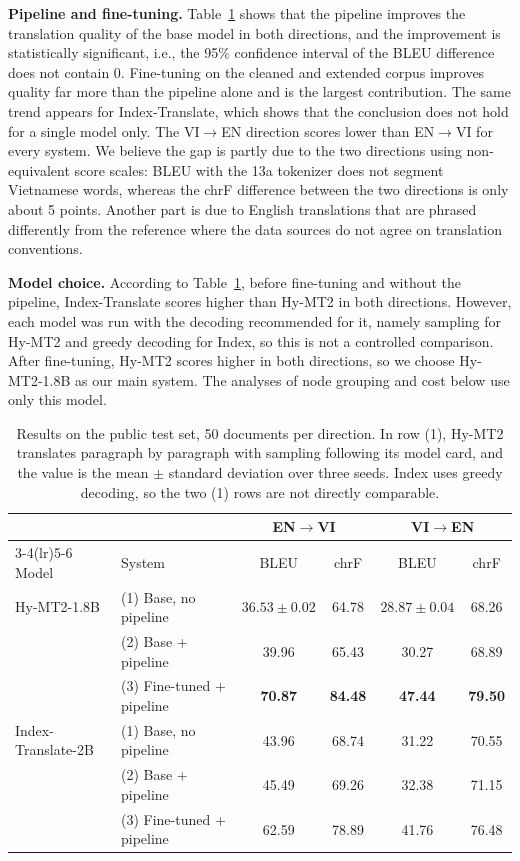 \documentclass[conference]{IEEEtran}
\newcommand{\envi}{EN$\rightarrow$VI}
\newcommand{\vien}{VI$\rightarrow$EN}
\begin{document}
\textbf{Pipeline and fine-tuning.} Table~\ref{tab:main} shows that the pipeline improves the translation quality of the base model in both directions, and the improvement is statistically significant, i.e., the 95\% confidence interval of the BLEU difference does not contain 0. Fine-tuning on the cleaned and extended corpus improves quality far more than the pipeline alone and is the largest contribution. The same trend appears for Index-Translate, which shows that the conclusion does not hold for a single model only. The \vien{} direction scores lower than \envi{} for every system. We believe the gap is partly due to the two directions using non-equivalent score scales: BLEU with the 13a tokenizer does not segment Vietnamese words, whereas the chrF difference between the two directions is only about 5 points. Another part is due to English translations that are phrased differently from the reference where the data sources do not agree on translation conventions.

\textbf{Model choice.} According to Table~\ref{tab:main}, before fine-tuning and without the pipeline, Index-Translate scores higher than Hy-MT2 in both directions. However, each model was run with the decoding recommended for it, namely sampling for Hy-MT2 and greedy decoding for Index, so this is not a controlled comparison. After fine-tuning, Hy-MT2 scores higher in both directions, so we choose Hy-MT2-1.8B as our main system. The analyses of node grouping and cost below use only this model.

\begin{table}[t]
\caption{Results on the public test set, 50 documents per direction. In row (1), Hy-MT2 translates paragraph by paragraph with sampling following its model card, and the value is the mean $\pm$ standard deviation over three seeds. Index uses greedy decoding, so the two (1) rows are not directly comparable.}
\label{tab:main}
\centering
\begin{tabular}{llcccc}
\toprule
 & & \multicolumn{2}{c}{\envi{}} & \multicolumn{2}{c}{\vien{}} \\
\cmidrule(lr){3-4}\cmidrule(lr){5-6}
Model & System & BLEU & chrF & BLEU & chrF \\
\midrule
Hy-MT2-1.8B & (1) Base, no pipeline & $36.53 \pm 0.02$ & 64.78 & $28.87 \pm 0.04$ & 68.26 \\
 & (2) Base + pipeline & 39.96 & 65.43 & 30.27 & 68.89 \\
 & (3) Fine-tuned + pipeline & \textbf{70.87} & \textbf{84.48} & \textbf{47.44} & \textbf{79.50} \\
\midrule
Index-Translate-2B & (1) Base, no pipeline & 43.96 & 68.74 & 31.22 & 70.55 \\
 & (2) Base + pipeline & 45.49 & 69.26 & 32.38 & 71.15 \\
 & (3) Fine-tuned + pipeline & 62.59 & 78.89 & 41.76 & 76.48 \\
\bottomrule
\end{tabular}
\end{table}
\end{document}
